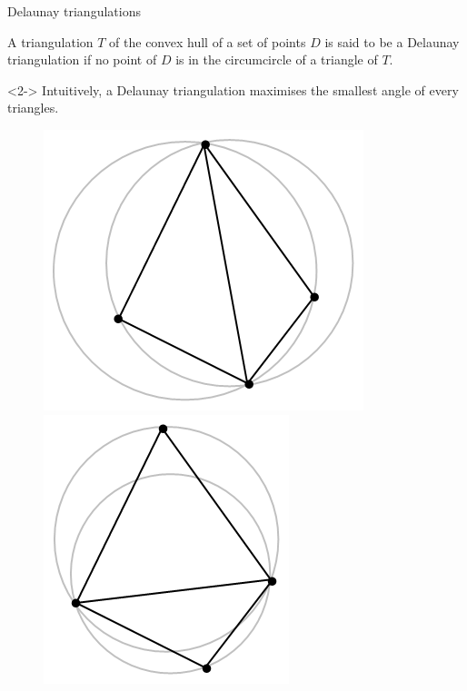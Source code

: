 \documentclass[18pt]{beamer}
\begin{document}
\begin{frame}{Delaunay triangulations}
 
 \begin{definition}
  A triangulation $T$ of the convex hull of a set of points $D$ is said to be a Delaunay triangulation if no point of $D$ is in the circumcircle of a triangle of $T$.
 \end{definition}
 \begin{uncoverenv}<2->
Intuitively, a Delaunay triangulation maximises the smallest angle of every triangles.
\end{uncoverenv}
 \begin{figure}

\begin{minipage}{.5\textwidth}
 \centering
\includegraphics[scale=0.45]{Delaunay_before_flip}
\end{minipage}%
\begin{minipage}{.5\textwidth}
 \centering
\includegraphics[scale=0.45]{Delaunay_after_flip}
\end{minipage}
\end{figure}
\end{frame}
\end{document}
